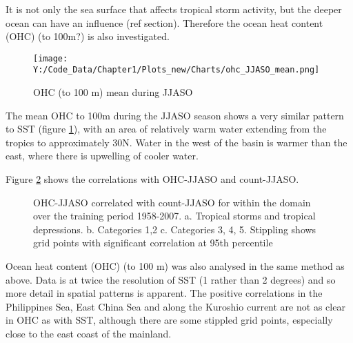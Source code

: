 It is not only the sea surface that affects tropical storm activity, but the deeper ocean can have an influence (ref section). Therefore the ocean heat content (OHC) (to 100m?) is also investigated.

\begin{figure} %
	\centering
	\noindent\texttt{[image: Y:/Code\_Data/Chapter1/Plots\_new/Charts/ohc\_JJASO\_mean.png]}
	\caption{OHC (to 100 m) mean during JJASO}\label{fig:OHC_JJASO}
\end{figure}

The mean OHC to 100m during the JJASO season shows a very similar pattern to SST (figure \ref{fig:OHC_JJASO}), with an area of relatively warm water extending from the tropics to approximately 30N. Water in the west of the basin is warmer than the east, where there is upwelling of cooler water.


Figure \ref{fig:ohc_currJJASO} shows the correlations with OHC-JJASO and count-JJASO.

\begin{figure}
	\centering

	\caption{OHC-JJASO correlated with count-JJASO for within the domain over the training period 1958-2007. a. Tropical storms and tropical depressions. b. Categories 1,2 c. Categories 3, 4, 5. Stippling shows grid points with significant correlation at 95th percentile} \label{fig:ohc_currJJASO} 
\end{figure} 

Ocean heat content (OHC) (to 100 m) was also analysed in the same method as above. Data is at twice the resolution of SST (1 rather than 2 degrees) and so more detail in spatial patterns is apparent. 
The positive correlations in the Philippines Sea, East China Sea and along the Kuroshio current are not as clear in OHC as with SST, although there are some stippled grid points, especially close to the east coast of the mainland.

